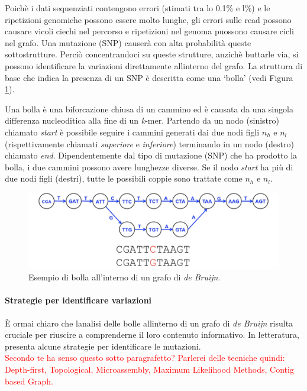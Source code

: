 \documentclass[../main.tex]{subfiles}
\begin{document}
\noindent
Poich\`e i dati sequenziati contengono errori (stimati tra lo 0.1\% e l\%) e le ripetizioni genomiche possono essere molto lunghe, gli errori sulle read possono causare vicoli ciechi nel percorso e ripetizioni nel genoma puossono causare cicli nel grafo. Una mutazione (SNP) causerà con alta probabilità queste sottostrutture. Perci\`o concentrandoci su queste strutture, anzich\`e buttarle via, si possono identificare la variazioni direttamente all\textquotesingle interno del grafo. La struttura di base che indica la presenza di un SNP è descritta come una `bolla' (vedi Figura \ref{fig:dBG_bubble}).

\begin{definition}
Una bolla \`e una biforcazione chiusa di un cammino ed \`e causata da una singola differenza nucleoditica alla fine di un \textit{k}-mer. Partendo da un nodo (sinistro) chiamato \textit{start} \`e possibile seguire i cammini generati dai due nodi figli $n_h$ e $n_l$ (rispettivamente chiamati \textit{superiore} e \textit{inferiore}) terminando in un nodo (destro) chiamato \textit{end}. Dipendentemente dal tipo di mutazione (SNP) che ha prodotto la bolla, i due cammini possono avere lunghezze diverse. Se il nodo \textit{start} ha più di due nodi figli (destri), tutte le possibili coppie sono trattate come $n_h$ e $n_l$.
\end{definition}

\begin{figure}[h!]
	\centering
  	\captionsetup{justification=centering}
  	\includegraphics[scale=.3]{images/dBG_bubble.png}
  	\caption{Esempio di bolla all'interno di un grafo di \textit{de Bruijn}.}
  	\label{fig:dBG_bubble}
\end{figure}

\paragraph{Strategie per identificare variazioni} \`E ormai chiaro che l\textquotesingle analisi delle bolle all\textquotesingle interno di un grafo di \textit{de Bruijn} risulta cruciale per riuscire a comprenderne il loro contenuto informativo. In letteratura, \cite{leggett2014reference} presenta alcune strategie per identificare le mutazioni. \\ \textcolor{red}{Secondo te ha senso questo sotto paragrafetto? Parlerei delle tecniche quindi: Depth-first, Topological, Microassembly, Maximum Likelihood Methods, Contig based Graph.}
\end{document}
